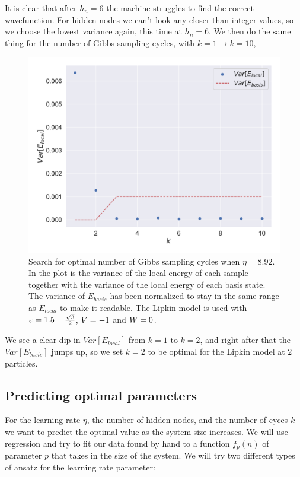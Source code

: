 It is clear that after $h_n = 6$ the machine struggles to find the correct wavefunction. For hidden nodes we can't look any closer than integer values, so we choose the lowest variance again, this time at $h_n = 6$. We then do the same thing for the number of Gibbs sampling cycles, with $k = 1 \rightarrow k=10$,
\begin{figure}[H]
  \begin{center}
    \includegraphics[width=\optgridwidhtratio\textwidth]{Figures/Plots/OPt/Lipkin/[2][gibbs_k][e=500][1-10].pdf}
  \end{center}
  \caption{Search for optimal number of Gibbs sampling cycles when $\eta = 8.92$. In the plot is the variance of the local energy of each sample together with the variance of the local energy of each basis state. The variance of $E_{basis}$ has been normalized to stay in the same range as $E_{local}$ to make it readable. The Lipkin model is used with $\varepsilon = 1.5 - \frac{\sqrt{3}}{2}$, $V = -1$ and $W = 0$.}\label{fig:hn_depth2}
\end{figure}

We see a clear dip in $Var[E_{local}]$ from $k =1$ to $k=2$, and right after that the $Var[E_{basis}]$ jumps up, so we set $k=2$ to be optimal for the Lipkin model at $2$ particles.

\subsection{Predicting optimal parameters}

For the learning rate $\eta$, the number of hidden nodes, and the number of cyces $k$ we want to predict the optimal value as the system size increases. We will use regression and try to fit our data found by hand to a function $f_p(n)$ of parameter $p$ that takes in the size of the system. We will try two different types of ansatz for the learning rate parameter:

